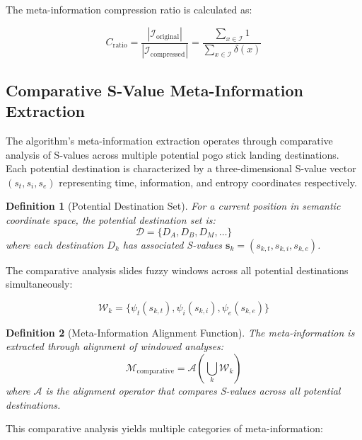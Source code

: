 \documentclass[12pt,a4paper]{article}
\newtheorem{definition}{Definition}
\begin{document}
The meta-information compression ratio is calculated as:

\begin{equation}
C_{\text{ratio}} = \frac{|\mathcal{I}_{\text{original}}|}{|\mathcal{I}_{\text{compressed}}|} = \frac{\sum_{x \in \mathcal{I}} 1}{\sum_{x \in \mathcal{I}} \delta(x)}
\end{equation}

\subsection{Comparative S-Value Meta-Information Extraction}

The algorithm's meta-information extraction operates through comparative analysis of S-values across multiple potential pogo stick landing destinations. Each potential destination is characterized by a three-dimensional S-value vector $(s_t, s_i, s_e)$ representing time, information, and entropy coordinates respectively.

\begin{definition}[Potential Destination Set]
For a current position in semantic coordinate space, the potential destination set is:
\begin{equation}
\mathcal{D} = \{D_A, D_B, D_M, \ldots\}
\end{equation}
where each destination $D_k$ has associated S-values $\mathbf{s}_k = (s_{k,t}, s_{k,i}, s_{k,e})$.
\end{definition}

The comparative analysis slides fuzzy windows across all potential destinations simultaneously:

\begin{equation}
\mathcal{W}_k = \{\psi_t(s_{k,t}), \psi_i(s_{k,i}), \psi_e(s_{k,e})\}
\end{equation}

\begin{definition}[Meta-Information Alignment Function]
The meta-information is extracted through alignment of windowed analyses:
\begin{equation}
\mathcal{M}_{\text{comparative}} = \mathcal{A}\left(\bigcup_{k} \mathcal{W}_k\right)
\end{equation}
where $\mathcal{A}$ is the alignment operator that compares S-values across all potential destinations.
\end{definition}

This comparative analysis yields multiple categories of meta-information:
\end{document}
